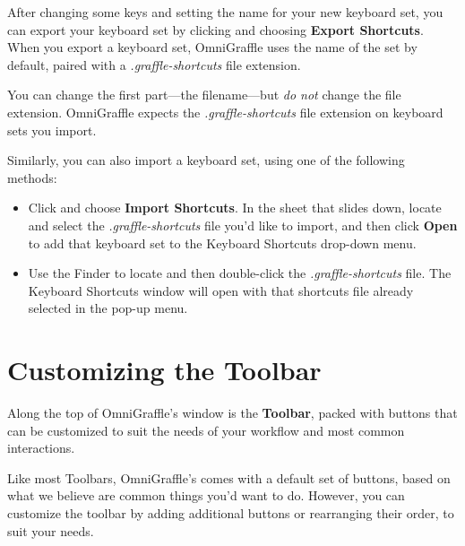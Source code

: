 \documentclass[../main.tex]{subfiles}
\begin{document}
\begin{ogpro}
  After changing some keys and setting the name for your new keyboard set, you can export your
  keyboard set by clicking  and choosing
  \textbf{Export Shortcuts}. When you export a keyboard set, OmniGraffle uses the name of the
  set by default, paired with a \textit{.graffle-shortcuts} file extension.


  \begin{ogwarning}
    You can change the first part---the filename---but \textit{do not} change the file extension.
    OmniGraffle expects the \textit{.graffle-shortcuts} file extension on keyboard sets you
    import.
  \end{ogwarning}

  Similarly, you can also import a keyboard set, using one of the following methods:

  \begin{itemize}
    \item Click  and choose \textbf{Import
      Shortcuts}. In the sheet that slides down, locate and select the
      \textit{.graffle-shortcuts} file you'd like to import, and then click \textbf{Open} to add
      that keyboard set to the Keyboard Shortcuts drop-down menu.
    \item Use the Finder to locate and then double-click the \textit{.graffle-shortcuts} file.
      The Keyboard Shortcuts window will open with that shortcuts file already selected in the
      pop-up menu.
  \end{itemize}
\end{ogpro}

\section{Customizing the Toolbar}

Along the top of OmniGraffle's window is the \textbf{Toolbar}, packed with buttons that can be
customized to suit the needs of your workflow and most common interactions.


Like most Toolbars, OmniGraffle's comes with a default set of buttons, based on what we believe
are common things you'd want to do. However, you can customize the toolbar by adding
additional buttons or rearranging their order, to suit your needs.
\end{document}
